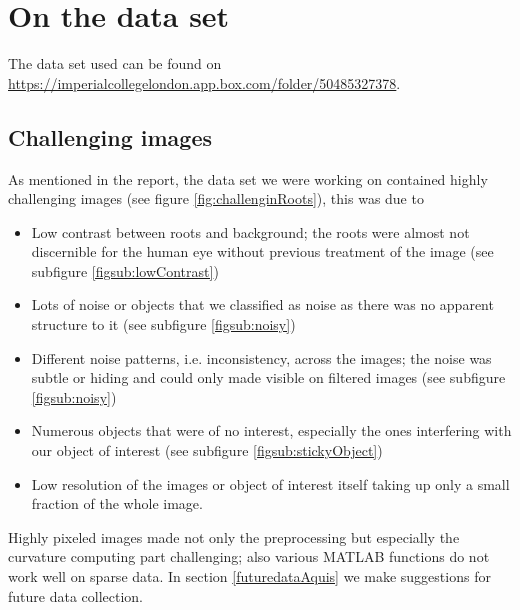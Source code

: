 \chapter{On the data set}

The data set used can be found on \url{https://imperialcollegelondon.app.box.com/folder/50485327378}.

\section{Challenging images}\label{subsec:challengingImages}

As mentioned in the report, the data set we were working on contained highly challenging images (see figure \ref{fig:challenginRoots}), this was due to
\begin{itemize}
	\item Low contrast between roots and background; the roots were almost not discernible for the human eye without previous treatment of the image (see subfigure \ref{figsub:lowContrast})
	\item Lots of noise or objects that we classified as noise as there was no apparent structure to it (see subfigure \ref{figsub:noisy})
	\item Different noise patterns, i.e. inconsistency, across the images; the noise was subtle or hiding and could only made visible on filtered images (see subfigure \ref{figsub:noisy})
	\item Numerous objects that were of no interest, especially the ones interfering with our object of interest (see subfigure \ref{figsub:stickyObject})
	\item Low resolution of the images or object of interest itself taking up only a small fraction of the whole image. 
\end{itemize}
Highly pixeled images made not only the preprocessing but especially the curvature computing part challenging; also various MATLAB functions do not work well on sparse data.
In section \ref{futuredataAquis} we make suggestions for future data collection.

